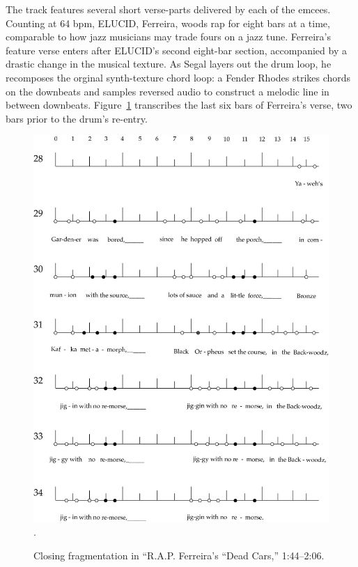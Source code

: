 The track features several short verse-parts delivered by each of the emcees. Counting
at 64 bpm, ELUCID, Ferreira, woods  rap for eight bars at a time, comparable to how
jazz musicians may trade fours on a jazz tune. Ferreira's feature verse enters after
ELUCID's second eight-bar section, accompanied by a drastic change in the musical 
texture. As Segal layers out the drum loop, he recomposes the orginal synth-texture
chord loop: a Fender Rhodes strikes chords on the downbeats and samples reversed audio
to construct a melodic line in between downbeats. Figure~\ref{fig:roryclosingfrag} 
transcribes the last six bars of Ferreira's verse, two bars prior to the drum's
re-entry.

    \begin{figure}[!htp]
        \centering
        \includegraphics{images/figures/chp 03/144206deadcarsendfrag.pdf}
        .\caption{Closing fragmentation in ``R.A.P. Ferreira's ``Dead Cars,'' 1:44--2:06.}
        \label{fig:roryclosingfrag}
    \end{figure}

